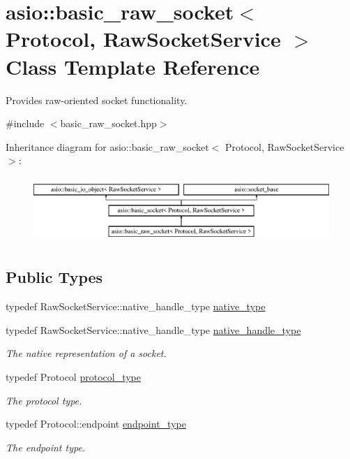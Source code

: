 \hypertarget{classasio_1_1basic__raw__socket}{}\section{asio\+:\+:basic\+\_\+raw\+\_\+socket$<$ Protocol, Raw\+Socket\+Service $>$ Class Template Reference}
\label{classasio_1_1basic__raw__socket}


Provides raw-\/oriented socket functionality.  




{\ttfamily \#include $<$basic\+\_\+raw\+\_\+socket.\+hpp$>$}

Inheritance diagram for asio\+:\+:basic\+\_\+raw\+\_\+socket$<$ Protocol, Raw\+Socket\+Service $>$\+:\begin{figure}[H]
\begin{center}
\leavevmode
\includegraphics[height=2.500000cm]{classasio_1_1basic__raw__socket}
\end{center}
\end{figure}
\subsection*{Public Types}
\begin{DoxyCompactItemize}
\item 
typedef Raw\+Socket\+Service\+::native\+\_\+handle\+\_\+type \hyperlink{classasio_1_1basic__raw__socket_aef7c77cd3736fffd674702695c63287c}{native\+\_\+type}
\item 
typedef Raw\+Socket\+Service\+::native\+\_\+handle\+\_\+type \hyperlink{classasio_1_1basic__raw__socket_aa95021a3bc7d9d5a4648d4d82f57b8ae}{native\+\_\+handle\+\_\+type}
\begin{DoxyCompactList}\small\item\em The native representation of a socket. \end{DoxyCompactList}\item 
typedef Protocol \hyperlink{classasio_1_1basic__raw__socket_aa7e790d1b35972ac2c4d1d5999b94d93}{protocol\+\_\+type}
\begin{DoxyCompactList}\small\item\em The protocol type. \end{DoxyCompactList}\item 
typedef Protocol\+::endpoint \hyperlink{classasio_1_1basic__raw__socket_a75803815223ab2cbfa66c51a650236b5}{endpoint\+\_\+type}
\begin{DoxyCompactList}\small\item\em The endpoint type. \end{DoxyCompactList}\end{DoxyCompactItemize}
